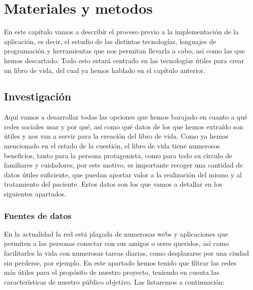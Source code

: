 \chapter{Materiales y metodos}
\label{cap:Capítulo 3}
En este capítulo vamos a describir el proceso previo a la implementación de la aplicación, es decir, el estudio de las distintas tecnologías, lenguajes de programación y herramientas que nos permitan llevarla a cabo, así como las que hemos descartado. Todo esto estará centrado en las tecnologías útiles para crear un libro de vida, del cual ya hemos hablado en el capítulo anterior.

\section{Investigación}

 Aquí vamos a desarrollar todas las opciones que hemos barajado en cuanto a qué redes sociales usar y por qué, así como qué datos de los que hemos extraído son útiles y nos van a servir para la creación del libro de vida. Como ya hemos mencionado en el estado de la cuestión, el libro de vida tiene numerosos beneficios, tanto para la persona protagonista, como para todo su círculo de familiares y cuidadores, por este motivo, es importante recoger una cantidad de datos útiles suficiente, que puedan aportar valor a la realización del mismo y al tratamiento del paciente. Estos datos son los que vamos a detallar en los siguientes apartados.

\subsection{Fuentes de datos}

En la actualidad la red está plagada de numerosas webs y aplicaciones que permiten a las personas conectar con sus amigos o seres queridos, así como facilitarles la vida con numerosas tareas diarias, como desplazarse por una ciudad sin perderse, por ejemplo. En este apartado hemos tenido que filtrar las redes más útiles para el propósito de nuestro proyecto, teniendo en cuenta las características de nuestro público objetivo. Las listaremos a continuación:

